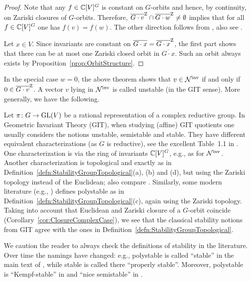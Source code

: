 \begin{proof}
	Note that any $f \in \mathbb C[V]^G$ is constant on $G$-orbits and hence, by continuity, on Zariski closures of $G$-orbits. Therefore, $\overline{G \cdot v}^{\operatorname{Z}} \cap \overline{G \cdot w}^{\operatorname{Z}} \neq \emptyset$ implies that for all $f \in \mathbb C[V]^G$ one has $f(v) = f(w)$. The other direction follows from \cite[Lemma~6.1]{DolgachevBook}, also see \cite[Theorem~3.12]{Wallach}.
	
	Let $x \in V$. Since invariants are constant on $\overline{G \cdot x} = \overline{G \cdot x}^{\operatorname{Z}}$, the first part shows that there can be at most one Zariski closed orbit in $\overline{G \cdot x}$. Such an orbit always exists by Proposition~\ref{prop:OrbitStructure}.
\end{proof}

In the special case $w=0$, the above theorem shows that $v \in \mathcal{N}^{\text{inv}}$ if and only if $0 \in \overline{G \cdot v}^{\operatorname{Z}}$. A vector $v$ lying in $\mathcal{N}^{\text{inv}}$ is called unstable (in the GIT sense). More generally, we have the following.

\begin{remark}\label{rem:UsualStabilityGIT}
	Let $\pi \colon G \to \operatorname{GL}(V)$ be a rational representation of a complex reductive group.
	In Geometric Invariant Theory (GIT), when studying (affine) GIT quotients one usually considers the notions unstable, semistable and stable. They have different equivalent characterizations (as $G$ is reductive), see the excellent Table~1.1 in \cite[p.~41]{mumford1977stability}. One characterization is via the ring of invariants $\mathbb C[V]^G$, e.g., as for $\mathcal{N}^{\text{inv}}$. Another characterization is topological and exactly as in Definition~\ref{defn:StabilityGroupTopological}(a), (b) and (d), but using the Zariski topology instead of the Euclidean; also compare \cite[Appendix, p.~194]{MumfordGITbook}. Similarly, some modern literature (e.g., \cite{thomas2006notes}) defines polystable as in Definition~\ref{defn:StabilityGroupTopological}(c), again using the Zariski topology. Taking into account that Euclidean and Zariski closure of a $G$-orbit coincide (Corollary~\ref{cor:ClosureComplexCase}), we see that the classical stability notions from GIT agree with the ones in Definition~\ref{defn:StabilityGroupTopological}.
	
	We caution the reader to always check the definitions of stability in the literature. Over time the namings have changed: e.g., polystable is called ``stable'' in the main text of \cite{MumfordGITbook}, while stable is called there ``properly stable''. Moreover, polystable is ``Kempf-stable'' in \cite{DolgachevBook} and ``nice semistable'' in \cite{NessStratification}.
	\hfill\remSymbol
\end{remark}

